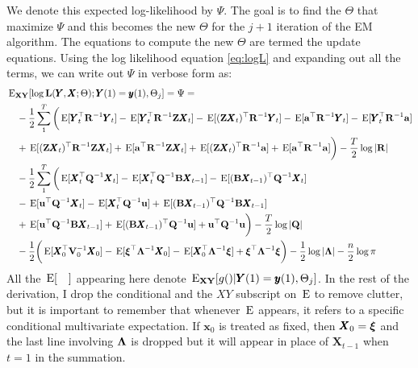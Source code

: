 \documentclass[]{article}
\def\xixi{\mbox{\boldmath $\xi$}}
\def\LAM{\mbox{\boldmath $\Lambda$}}
\def\UPS{\mbox{\boldmath $\Upsilon$}}
\def\XI{\mbox{\boldmath $\Xi$}}
\def\BB{\mbox{$\mathbf B$}}	\def\bb{\mbox{$\mathbf b$}} \def\Bb{\mbox{$\mathbf J$}} \def\Ba{\mbox{$\mathbf L$}} \def\Bm{\UPS}
\def\E{\,\textup{\textrm{E}}}
\def\EXy{\,\textup{\textrm{E}}_{\text{{\bf XY}}}}
\def\LL{\mbox{$\mathbf L$}}	\def\ll{\mbox{$\mathbf l$}}
\def\QQ{\mbox{$\mathbf Q$}}	 \def\qq{\mbox{$\mathbf q$}} \def\Qb{\mbox{$\mathbf G$}}  \def\Qm{\mathbb{Q}}
\def\RR{\mbox{$\mathbf R$}}	 \def\rr{\mbox{$\mathbf r$}} \def\Rb{\mbox{$\mathbf H$}}	\def\Rm{\mathbb{R}}
\def\VV{\mbox{$\mathbf V$}}	\def\vv{\mbox{$\mathbf v$}}
\def\XX{\mbox{$\pmb{X}$}}	\def\xx{\mbox{$\pmb{x}$}}
\def\YY{\mbox{$\pmb{Y}$}}	\def\yy{\mbox{$\pmb{y}$}}
\def\ZZ{\mbox{$\mathbf Z$}}	\def\zz{\mbox{$\mathbf z$}}	\def\Zb{\mbox{$\mathbf M$}} \def\Za{\mbox{$\mathbf N$}} \def\Zm{\XI}
\begin{document}
We denote this expected log-likelihood by $\Psi$. The goal is to find the $\Theta$ that maximize $\Psi$ and this becomes the new $\Theta$ for the  $j+1$ iteration of the EM algorithm.  The equations to compute the new $\Theta$ are termed the update equations.  Using the log likelihood equation \ref{eq:logL} and expanding out all the terms, we can write out $\Psi$  in verbose form as:
\begin{equation}\label{eq:expLL}
\begin{split}
&\EXy[\log\LL(\YY,\XX ; \Theta);\YY(1)=\yy(1),\Theta_j] = \Psi = \\
&\quad -\frac{1}{2}\sum_1^T\bigg( \E[\YY_t^\top \RR^{-1} \YY_t] - \E[\YY_t^\top \RR^{-1}\ZZ\XX_t] - \E[(\ZZ\XX_t)^\top\RR^{-1}\YY_t] - \E[\aa^\top\RR^{-1}\YY_t] - \E[\YY_t^\top\RR^{-1}\aa]\\
&\quad   + \E[(\ZZ\XX_t)^\top\RR^{-1}\ZZ\XX_t] + \E[\aa^\top\RR^{-1}\ZZ\XX_t] + \E[(\ZZ\XX_t)^\top\RR^{-1}\aa] + \E[\aa^\top\RR^{-1}\aa]\bigg) 
 - \frac{T}{2}\log|\RR|\\
&\quad - \frac{1}{2}\sum_1^T\bigg(\E[\XX_t^\top\QQ^{-1}\XX_t] - \E[\XX_t^\top\QQ^{-1}\BB\XX_{t-1}]  - \E[(\BB\XX_{t-1})^\top\QQ^{-1}\XX_t]\\ 
&\quad - \E[\uu^\top\QQ^{-1}\XX_t] - \E[\XX_t^\top\QQ^{-1}\uu] + \E[(\BB\XX_{t-1})^\top\QQ^{-1}\BB\XX_{t-1}]\\
&\quad  + \E[\uu^\top\QQ^{-1}\BB\XX_{t-1}] + \E[(\BB\XX_{t-1})^\top\QQ^{-1}\uu] + \uu^\top\QQ^{-1}\uu\bigg) - \frac{T}{2}\log|\QQ| \\
&\quad - \frac{1}{2}\bigg(\E[\XX_0^\top\VV_0^{-1}\XX_0] - \E[\xixi^\top\LAM^{-1}\XX_0] - \E[\XX_0^\top\LAM^{-1}\xixi] + \xixi^\top\LAM^{-1}\xixi\bigg) - \frac{1}{2}\log|\LAM|
-\frac{n}{2}\log\pi
\end{split}
\end{equation}
All the $\E[\quad]$ appearing here denote $\EXy[g()|\YY(1)=\yy(1),\Theta_j]$.  In the rest of the derivation, I drop the conditional and the $XY$ subscript on $\E$ to remove clutter, but it is important to remember that whenever $\E$ appears, it refers to a specific conditional multivariate expectation.  If $\xx_0$ is treated as fixed, then $\XX_0=\xixi$ and the last line involving $\LAM$ is dropped but it will appear in place of $\XX_{t-1}$ when $t=1$ in the summation.
\end{document}
